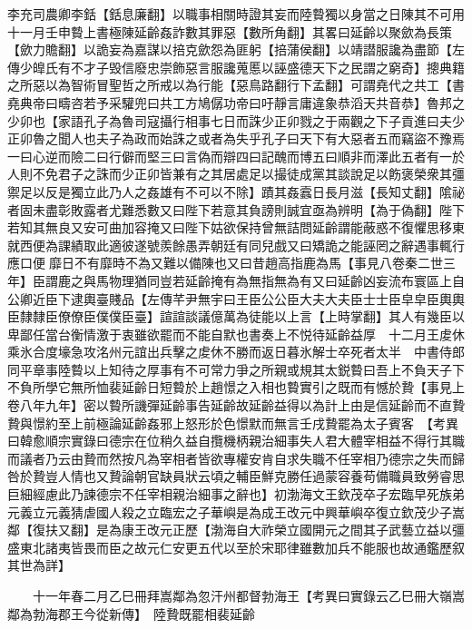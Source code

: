 李充司農卿李銛【銛息廉翻】以職事相關時證其妄而陸䞇獨以身當之日陳其不可用十一月壬申䞇上書極陳延齡姦詐數其罪惡【數所角翻】其畧曰延齡以聚歛為長策【歛力贍翻】以詭妄為嘉謀以掊克歛怨為匪躬【掊蒲侯翻】以靖譛服讒為盡節【左傳少皥氏有不才子毁信廢忠崇飾惡言服讒蒐慝以誣盛德天下之民謂之窮奇】摠典籍之所惡以為智術冒聖哲之所戒以為行能【惡鳥路翻行下孟翻】可謂堯代之共工【書堯典帝曰疇咨若予采驩兜曰共工方鳩僝功帝曰吁靜言庸違象恭滔天共音恭】魯邦之少卯也【家語孔子為魯司寇攝行相事七日而誅少正卯戮之于兩觀之下子貢進曰夫少正卯魯之聞人也夫子為政而始誅之或者為失乎孔子曰天下有大惡者五而竊盜不豫焉一曰心逆而險二曰行僻而堅三曰言偽而辯四曰記醜而博五曰順非而澤此五者有一於人則不免君子之誅而少正卯皆兼有之其居處足以撮徒成黨其談說足以飭褒榮衆其彊禦足以反是獨立此乃人之姦雄有不可以不除】蹟其姦蠧日長月滋【長知丈翻】隂祕者固未盡彰敗露者尤難悉數又曰陛下若意其負謗則誠宜亟為辨明【為于偽翻】陛下若知其無良又安可曲加容掩又曰陛下姑欲保持曾無詰問延齡謂能蔽惑不復懼思移東就西便為課績取此適彼遂號羨餘愚弄朝廷有同兒戲又曰矯詭之能誣罔之辭遇事輒行應口便靡日不有靡時不為又難以備陳也又曰昔趙高指鹿為馬【事見八卷秦二世三年】臣謂鹿之與馬物理猶同豈若延齡掩有為無指無為有又曰延齡凶妄流布寰區上自公卿近臣下逮輿臺賤品【左傳芊尹無宇曰王臣公公臣大夫大夫臣士士臣皁皁臣輿輿臣隸隸臣僚僚臣僕僕臣臺】諠諠談議億萬為徒能以上言【上時掌翻】其人有幾臣以卑鄙任當台衡情激于衷雖欲罷而不能自默也書奏上不悦待延齡益厚　十二月王䖍休乘氷合度壕急攻洺州元誼出兵擊之䖍休不勝而返日暮氷解士卒死者太半　中書侍郎同平章事陸䞇以上知待之厚事有不可常力爭之所親或規其太鋭䞇曰吾上不負天子下不負所學它無所恤裴延齡日短䞇於上趙憬之入相也䞇實引之既而有憾於贄【事見上卷八年九年】密以䞇所譏彈延齡事告延齡故延齡益得以為計上由是信延齡而不直贄贄與憬約至上前極論延齡姦邪上怒形於色憬默而無言壬戌贄罷為太子賓客　【考異曰韓愈順宗實錄曰德宗在位稍久益自攬機柄親治細事失人君大體宰相益不得行其職而議者乃云由贄而然按凡為宰相者皆欲專權安肯自求失職不任宰相乃德宗之失而歸咎於贄豈人情也又贄論朝官缺員狀云頃之輔臣鮮克勝任過蒙容養苟備職員致勞睿思巨細經慮此乃諫德宗不任宰相親治細事之辭也】初渤海文王欽茂卒子宏臨早死族弟元義立元義猜虐國人殺之立臨宏之子華嶼是為成王改元中興華嶼卒復立欽茂少子嵩鄰【復扶又翻】是為康王改元正歷【渤海自大祚榮立國開元之間其子武藝立益以彊盛東北諸夷皆畏而臣之故元仁安更五代以至於宋耶律雖數加兵不能服也故通鑑歷叙其世為詳】

　　十一年春二月乙巳冊拜嵩鄰為忽汗州都督勃海王【考異曰實錄云乙巳冊大嶺嵩鄰為勃海郡王今從新傳】　陸贄既罷相裴延齡

